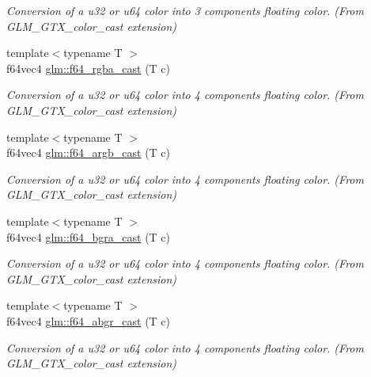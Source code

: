 \begin{DoxyCompactItemize}
\begin{DoxyCompactList}\small\item\em Conversion of a u32 or u64 color into 3 components floating color. (From G\+L\+M\+\_\+\+G\+T\+X\+\_\+color\+\_\+cast extension) \end{DoxyCompactList}\item 
\hypertarget{group__gtx__color__cast_gaa97be6d4369793feec9cd240306ea451}{}{\footnotesize template$<$typename T $>$ }\\f64vec4 \hyperlink{group__gtx__color__cast_gaa97be6d4369793feec9cd240306ea451}{glm\+::f64\+\_\+rgba\+\_\+cast} (T c)\label{group__gtx__color__cast_gaa97be6d4369793feec9cd240306ea451}

\begin{DoxyCompactList}\small\item\em Conversion of a u32 or u64 color into 4 components floating color. (From G\+L\+M\+\_\+\+G\+T\+X\+\_\+color\+\_\+cast extension) \end{DoxyCompactList}\item 
\hypertarget{group__gtx__color__cast_ga3eada64cecd6911a234e7263956cea50}{}{\footnotesize template$<$typename T $>$ }\\f64vec4 \hyperlink{group__gtx__color__cast_ga3eada64cecd6911a234e7263956cea50}{glm\+::f64\+\_\+argb\+\_\+cast} (T c)\label{group__gtx__color__cast_ga3eada64cecd6911a234e7263956cea50}

\begin{DoxyCompactList}\small\item\em Conversion of a u32 or u64 color into 4 components floating color. (From G\+L\+M\+\_\+\+G\+T\+X\+\_\+color\+\_\+cast extension) \end{DoxyCompactList}\item 
\hypertarget{group__gtx__color__cast_ga19b9b07bc4b654fb5a464b52baed2b95}{}{\footnotesize template$<$typename T $>$ }\\f64vec4 \hyperlink{group__gtx__color__cast_ga19b9b07bc4b654fb5a464b52baed2b95}{glm\+::f64\+\_\+bgra\+\_\+cast} (T c)\label{group__gtx__color__cast_ga19b9b07bc4b654fb5a464b52baed2b95}

\begin{DoxyCompactList}\small\item\em Conversion of a u32 or u64 color into 4 components floating color. (From G\+L\+M\+\_\+\+G\+T\+X\+\_\+color\+\_\+cast extension) \end{DoxyCompactList}\item 
\hypertarget{group__gtx__color__cast_ga29317ef1aeea12967d230043b777c95e}{}{\footnotesize template$<$typename T $>$ }\\f64vec4 \hyperlink{group__gtx__color__cast_ga29317ef1aeea12967d230043b777c95e}{glm\+::f64\+\_\+abgr\+\_\+cast} (T c)\label{group__gtx__color__cast_ga29317ef1aeea12967d230043b777c95e}

\begin{DoxyCompactList}\small\item\em Conversion of a u32 or u64 color into 4 components floating color. (From G\+L\+M\+\_\+\+G\+T\+X\+\_\+color\+\_\+cast extension) \end{DoxyCompactList}\end{DoxyCompactItemize}


